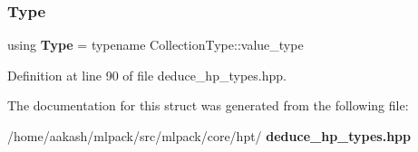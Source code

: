 \subsubsection{Type}
{\footnotesize\ttfamily using \textbf{ Type} =  typename Collection\+Type\+::value\+\_\+type}



Definition at line 90 of file deduce\+\_\+hp\+\_\+types.\+hpp.



The documentation for this struct was generated from the following file\+:\begin{DoxyCompactItemize}
\item 
/home/aakash/mlpack/src/mlpack/core/hpt/\textbf{ deduce\+\_\+hp\+\_\+types.\+hpp}\end{DoxyCompactItemize}
